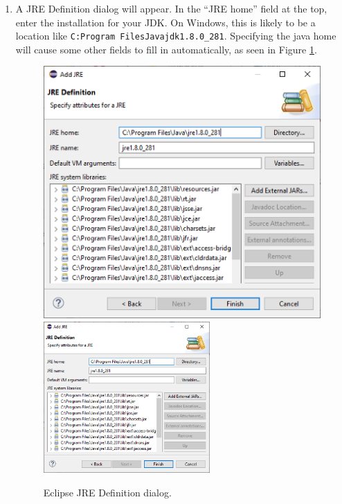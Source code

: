 \begin{enumerate}
\item A {\sf JRE Definition} dialog will appear. In the ``{\sf JRE home}''
field at the top, enter the installation \directory{} for your JDK.
\ifWindows %
On Windows, this is likely to be a location like {\tt C:\BKS Program
Files\BKS Java\BKS jdk1.8.0\_281}. Specifying the java
home \directory{} will cause some other fields to fill in
automatically, as seen in Figure \ref{JREDefinition:fig}.
%
\begin{figure}[ht]
\begin{center}
\iflatexml
   \includegraphics[]{images/EclipseJREDefinition}
\else
   \includegraphics[width=0.6\textwidth]{images/EclipseJREDefinition}
\fi
\end{center}
\caption{Eclipse JRE Definition dialog.}
\label{JREDefinition:fig}
\end{figure}
\fi %


\end{enumerate}
